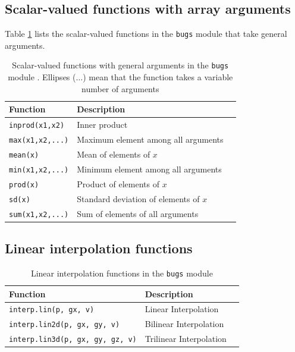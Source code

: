 \documentclass[11pt, a4paper, titlepage]{report}
\begin{document}
\clearpage

\subsection{Scalar-valued functions with array arguments}

Table \ref{table:bugs:scalar2} lists the scalar-valued functions in the
\texttt{bugs} module that take general arguments.

\begin{table}[h]
  \centering
\begin{tabular}{lll}
\hline
Function & Description \\
\hline
\verb+inprod(x1,x2)+ & Inner product \\
\verb+max(x1,x2,...)+ & Maximum element among all arguments \\
\verb+mean(x)+  & Mean of elements of $x$ \\
\verb+min(x1,x2,...)+ & Minimum element among all arguments \\
\verb+prod(x)+  & Product of elements of $x$ \\
\verb+sd(x)+    & Standard deviation of elements of $x$ \\
\verb+sum(x1,x2,...)+   & Sum of elements of all arguments \\
\hline
\end{tabular}
\caption{Scalar-valued functions with general
  arguments in the \texttt{bugs} module \label{table:bugs:scalar2}.
  Ellipses ($\ldots$) mean that the function takes a variable number of
  arguments}
\end{table}

\subsection{Linear interpolation functions}

\begin{table}[h]
  \centering
\begin{tabular}{lll}
\hline
Function & Description \\
\hline
\verb+interp.lin(p, gx, v)+    & Linear Interpolation \\
\verb+interp.lin2d(p, gx, gy, v)+ & Bilinear Interpolation \\
\verb+interp.lin3d(p, gx, gy, gz, v)+ & Trilinear Interpolation \\
\hline
\end{tabular}
\caption{Linear interpolation functions in the \texttt{bugs} module \label{table:bugs:interplin}}
\end{table}
\end{document}
